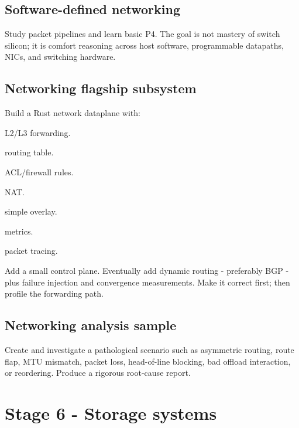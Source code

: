 \documentclass[11pt,letterpaper]{article}
\begin{document}
\subsection*{Software-defined networking}

Study packet pipelines and learn basic P4. The goal is not mastery of switch silicon; it is comfort reasoning across host software, programmable datapaths, NICs, and switching hardware.

\subsection*{Networking flagship subsystem}

Build a Rust network dataplane with:

\begin{topics}

\item L2/L3 forwarding.

\item routing table.

\item ACL/firewall rules.

\item NAT.

\item simple overlay.

\item metrics.

\item packet tracing.

\end{topics}

Add a small control plane. Eventually add dynamic routing - preferably BGP - plus failure injection and convergence measurements. Make it correct first; then profile the forwarding path.

\subsection*{Networking analysis sample}

Create and investigate a pathological scenario such as asymmetric routing, route flap, MTU mismatch, packet loss, head-of-line blocking, bad offload interaction, or reordering. Produce a rigorous root-cause report.

\section{Stage 6 - Storage systems}\label{sec:10}
\end{document}
